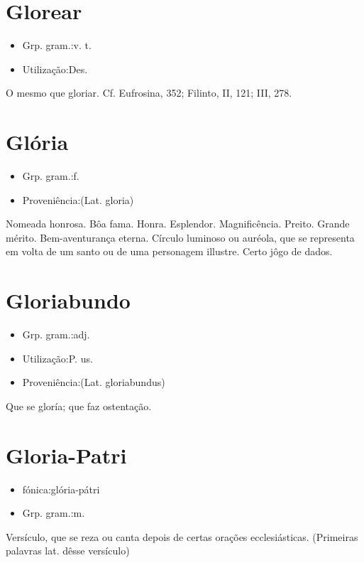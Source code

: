 \section{Glorear}
\begin{itemize}
\item {Grp. gram.:v. t.}
\end{itemize}
\begin{itemize}
\item {Utilização:Des.}
\end{itemize}
O mesmo que \textunderscore gloriar\textunderscore . Cf. \textunderscore Eufrosina\textunderscore , 352; Filinto, II, 121; III, 278.
\section{Glória}
\begin{itemize}
\item {Grp. gram.:f.}
\end{itemize}
\begin{itemize}
\item {Proveniência:(Lat. \textunderscore gloria\textunderscore )}
\end{itemize}
Nomeada honrosa.
Bôa fama.
Honra.
Esplendor.
Magnificência.
Preito.
Grande mérito.
Bem-aventurança eterna.
Círculo luminoso ou auréola, que se representa em volta de um santo ou de uma personagem illustre.
Certo jôgo de dados.
\section{Gloriabundo}
\begin{itemize}
\item {Grp. gram.:adj.}
\end{itemize}
\begin{itemize}
\item {Utilização:P. us.}
\end{itemize}
\begin{itemize}
\item {Proveniência:(Lat. \textunderscore gloriabundus\textunderscore )}
\end{itemize}
Que se gloría; que faz ostentação.
\section{Gloria-Patri}
\begin{itemize}
\item {fónica:glória-pátri}
\end{itemize}
\begin{itemize}
\item {Grp. gram.:m.}
\end{itemize}
Versículo, que se reza ou canta depois de certas orações ecclesiásticas.
(Primeiras palavras lat. dêsse versículo)
